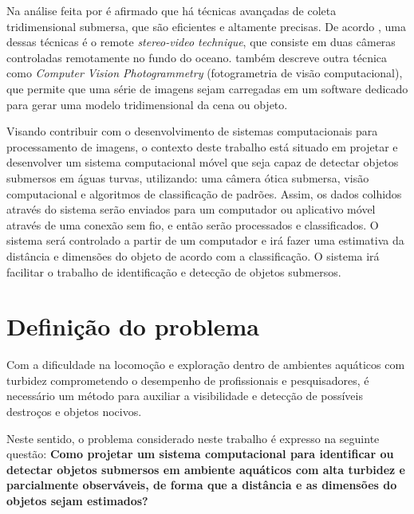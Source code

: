 Na análise feita por  é afirmado que há técnicas avançadas de coleta tridimensional submersa, que são eficientes e altamente precisas. De acordo , uma dessas técnicas é o remote \textit{stereo-video technique}, que consiste em duas câmeras controladas remotamente no fundo do oceano.  também descreve outra técnica como \textit{Computer Vision Photogrammetry} (fotogrametria de visão computacional), que permite que uma série de imagens sejam carregadas em um software dedicado para gerar uma modelo tridimensional da cena ou objeto.


Visando contribuir com o desenvolvimento de sistemas computacionais para processamento de imagens, o contexto deste trabalho está situado em projetar e desenvolver um sistema computacional móvel que seja capaz de detectar objetos submersos em águas turvas, utilizando: uma câmera ótica submersa, visão computacional e algoritmos de classificação de padrões. Assim, os dados colhidos através do sistema serão enviados para um computador ou aplicativo móvel através de uma conexão sem fio, e então serão processados e classificados. O sistema será controlado a partir de um computador e irá fazer uma estimativa da distância e dimensões do objeto de acordo com a classificação. O sistema irá facilitar o trabalho de identificação e detecção de objetos submersos.


\section{Definição do problema} 


Com a dificuldade na locomoção e exploração dentro de ambientes aquáticos com turbidez comprometendo o desempenho de profissionais e pesquisadores, é necessário um método para auxiliar a visibilidade e detecção de possíveis destroços e objetos nocivos.

% 
Neste sentido, o problema considerado neste trabalho é expresso na seguinte questão: \textbf{Como projetar um sistema computacional para identificar ou detectar objetos submersos em ambiente aquáticos com alta turbidez e parcialmente observáveis, de forma que a distância e as dimensões do objetos sejam estimados?} 

